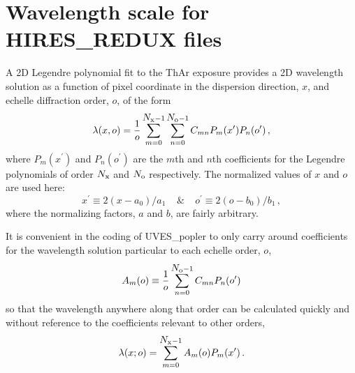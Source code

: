 \documentclass[12pt]{article}
\newcommand{\Nx}{\hbox{$N_{\rm x}$}}
\newcommand{\No}{\hbox{$N_{\rm o}$}}
\begin{document}
\section{Wavelength scale for HIRES\_REDUX files}

A 2D Legendre polynomial fit to the ThAr exposure provides a 2D
wavelength solution as a function of pixel coordinate in the
dispersion direction, $x$, and echelle diffraction order, $o$, of the
form
\begin{equation}
\lambda(x,o) = \frac{1}{o} \sum_{m=0}^{\Nx-1} \sum_{n=0}^{\No-1} C_{mn}P_m(x^\prime)P_n(o^\prime)\,,
\end{equation}
where $P_m(x^\prime)$ and $P_n(o^\prime)$ are the $m$th and $n$th
coefficients for the Legendre polynomials of order $\Nx$ and $\No$
respectively. The normalized values of $x$ and $o$ are used here:
\begin{equation}
x^\prime\equiv2(x-a_0)/a_1~~~~~\&~~~~~o^\prime\equiv2(o-b_0)/b_1\,,
\end{equation}
where the normalizing factors, $a$ and $b$, are fairly arbitrary.

It is convenient in the coding of UVES\_popler to only carry around
coefficients for the wavelength solution particular to each echelle
order, $o$,
\begin{equation}
A_m(o) \equiv \frac{1}{o} \sum_{n=0}^{\No-1} C_{mn}P_n(o^\prime)
\end{equation}
so that the wavelength anywhere along that order can be calculated
quickly and without reference to the coefficients relevant to other
orders,
\begin{equation}
\lambda(x; o) = \sum_{m=0}^{\Nx-1} A_m(o)P_m(x^\prime)\,.
\end{equation}
\end{document}
